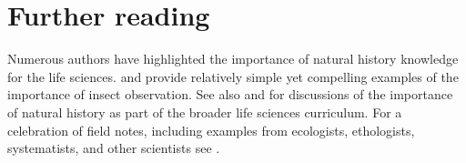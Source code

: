 \documentclass[letterpaper, 11pt]{article}
\begin{document}
\section*{Further reading}
Numerous authors have highlighted the importance of natural history knowledge for the life sciences. \cite{agrawal2014} and \cite{wilcoveeisner2000} provide relatively simple yet compelling examples of the importance of insect observation. See also \cite{Schmidly449} and \cite{Barrows13042016} for discussions of the importance of natural history as part of the broader life sciences curriculum. For a celebration of field notes, including examples from ecologists, ethologists, systematists, and other scientists see \cite{canfield2011field}. 



\end{document}
